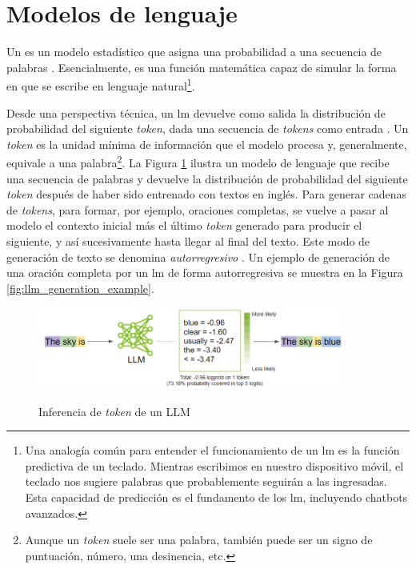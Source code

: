 \section{Modelos de lenguaje}

Un  es un modelo estadístico que asigna una probabilidad a una secuencia de palabras \cite{ModelacionLenguaje2024}. Esencialmente, es una función matemática capaz de simular la forma en que se escribe en lenguaje natural\footnote{Una analogía común para entender el funcionamiento de un \gls{lm} es la función predictiva de un teclado. Mientras escribimos en nuestro dispositivo móvil, el teclado nos sugiere palabras que probablemente seguirán a las ingresadas. Esta capacidad de predicción es el fundamento de los \gls{lm}, incluyendo chatbots avanzados.}.

Desde una perspectiva técnica, un \gls{lm} devuelve como salida la distribución de probabilidad del siguiente \emph{token}, dada una secuencia de \emph{tokens} como entrada \citep{GenerationLLMs}. Un \emph{token} es la unidad mínima de información que el modelo procesa y, generalmente, equivale a una palabra\footnote{Aunque un \emph{token} suele ser una palabra, también puede ser un signo de puntuación, número, una desinencia, etc.}.  La Figura \ref{fig:llm_generation} ilustra un modelo de lenguaje que recibe una secuencia de palabras y devuelve la distribución de probabilidad del siguiente \emph{token} después de haber sido entrenado con textos en inglés. Para generar cadenas de \emph{tokens}, para formar, por ejemplo, oraciones completas, se vuelve a pasar al modelo el contexto inicial más el último \emph{token} generado para producir el siguiente, y así sucesivamente hasta llegar al final del texto. Este modo de generación de texto se denomina \emph{autorregresivo} \citep{malachAutoRegressiveNextTokenPredictors2023}. Un ejemplo de generación de una oración completa por un \gls{lm} de forma autorregresiva se muestra en la Figura \ref{fig:llm_generation_example}.

\begin{figure}[H]
    \caption[Inferencia de \emph{token} de un LLM]{Inferencia de \emph{token} de un LLM}
    \centering
    \includegraphics[width=0.9\textwidth]{./figuras/LLM_predice_token.png}
    \label{fig:llm_generation}
\end{figure}

